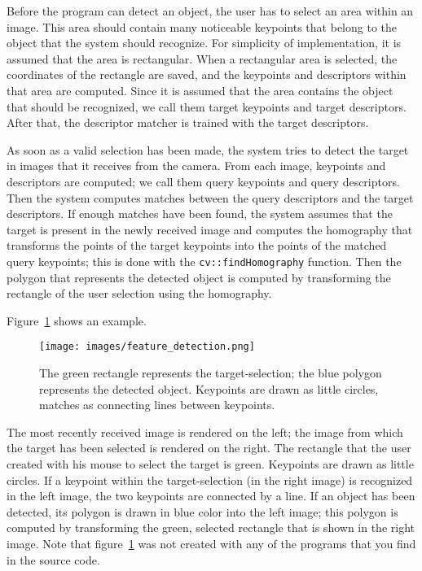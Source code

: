 \documentclass{article}
\newcommand{\code}[1]{\texttt{#1}}
\begin{document}
Before the program can detect an object, the user has to select an area within an image.
This area should contain many noticeable keypoints that belong
to the object that the system should recognize.
For simplicity of implementation, it is assumed that the area is rectangular.
When a rectangular area is selected, the coordinates of the rectangle are saved,
and the keypoints and descriptors within that area are computed.
Since it is assumed that the area contains the object that should be recognized,
we call them target keypoints and target descriptors.
After that, the descriptor matcher is trained with the target descriptors.

As soon as a valid selection has been made,
the system tries to detect the target in images that it receives from the camera.
From each image, keypoints and descriptors are computed;
we call them query keypoints and query descriptors.
Then the system computes matches between the query descriptors and the target descriptors.
If enough matches have been found,
the system assumes that the target is present in the newly received image
and computes the homography that transforms the points of the target keypoints
into the points of the matched query keypoints;
this is done with the \code{cv::findHomography} function.
Then the polygon that represents the detected object is computed
by transforming the rectangle of the user selection using the homography.

Figure~\ref{fig:feature_det} shows an example.
\begin{figure}
	\centering
	\texttt{[image: images/feature\_detection.png]}
	\caption{The green rectangle represents the target-selection; the blue polygon
	represents the detected object. Keypoints are drawn as little circles, matches
	as connecting lines between keypoints.}
	\label{fig:feature_det}
\end{figure}
The most recently received image is rendered on the left;
the image from which the target has been selected is rendered on the right.
The rectangle that the user created with his mouse to select the target is
green.
Keypoints are drawn as little circles.
If a keypoint within the target-selection (in the right image)
is recognized in the left image, the two keypoints are connected by a line.
If an object has been detected, its polygon is drawn in blue color into the left image;
this polygon is computed by transforming the green, selected rectangle
that is shown in the right image.
Note that figure~\ref{fig:feature_det} was not created with any of the programs
that you find in the source code.
\end{document}
